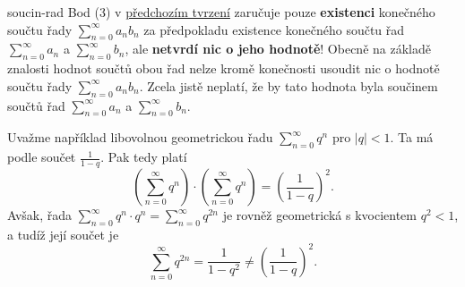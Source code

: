 \begin{warning}{}{soucin-rad}
 Bod (3) v \hyperref[prop:aritmetika-ciselnych-rad]{předchozím tvrzení} zaručuje
 pouze \textbf{existenci} konečného součtu řady $\sum_{n=0}^{\infty} a_nb_n$ za
 předpokladu existence konečného součtu řad $\sum_{n=0}^{\infty} a_n$ a
 $\sum_{n=0}^{\infty} b_n$, ale \textbf{netvrdí nic o jeho hodnotě}! Obecně na
 základě znalosti hodnot součtů obou řad nelze kromě konečnosti usoudit nic o
 hodnotě součtu řady $\sum_{n=0}^{\infty} a_nb_n$. Zcela jistě neplatí, že by
 tato hodnota byla součinem součtů řad $\sum_{n=0}^{\infty} a_n$ a
 $\sum_{n=0}^{\infty} b_n$.

 Uvažme například libovolnou geometrickou řadu $\sum_{n=0}^{\infty} q^{n}$ pro
 $|q| < 1$. Ta má podle  součet
 $\frac{1}{1-q}$. Pak tedy platí
 \[
  \left( \sum_{n=0}^{\infty} q^{n} \right) \cdot \left( \sum_{n=0}^{\infty} q^n
  \right) = \left( \frac{1}{1-q} \right)^2.
 \]
 Avšak, řada $\sum_{n=0}^{\infty} q^{n} \cdot q^{n} = \sum_{n=0}^{\infty}
 q^{2n}$ je rovněž geometrická s kvocientem $q^{2} < 1$, a tudíž její součet je
 \[
  \sum_{n=0}^{\infty} q^{2n} = \frac{1}{1-q^2} \neq \left( \frac{1}{1-q}
  \right)^2.
 \]
\end{warning}


